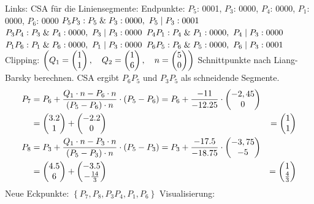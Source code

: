 \documentclass[a4paper,10pt,DIV=14]{article}
\begin{document}
\newpage
Links: \newline
CSA für die Liniensegmente: \newline
Endpunkte: $P_5$: 0001, $P_3$: 0000, $P_4$: 0000, $P_1$: 0000, $P_6$: 0000 \newline
$P_5P_3: P_5 \mathrel{\&} P_3: 0000,\ P_5 \mathrel{|} P_3: 0001$ \newline
$P_3P_4: P_3 \mathrel{\&} P_4: 0000,\ P_3 \mathrel{|} P_3: 0000$ \newline
$P_4P_1: P_4 \mathrel{\&} P_1: 0000,\ P_4 \mathrel{|} P_3: 0000$ \newline
$P_1P_6: P_1 \BitAnd P_6: 0000,\ P_1 \BitOr P_3: 0000$ \newline
$P_6P_5: P_6 \mathrel{\&} P_5: 0000,\ P_6 \mathrel{|} P_3: 0001$ \newline
Clipping: $\left(Q_1= \begin{pmatrix} 1 \\ 1 \end{pmatrix}, \quad Q_2= \begin{pmatrix} 1 \\ 6 \end{pmatrix}, \quad n = \begin{pmatrix} 5 \\ 0 \end{pmatrix} \right)$\newline
Schnittpunkte nach Liang-Barsky berechnen. CSA ergibt $P_6P_5$ und $P_3P_5$ als schneidende Segmente.\newline
\begin{align*}
P_7 &= P_6 + \frac{Q_1 \cdot n - P_6 \cdot n}{\left(P_5-P_6\right) \cdot n} \cdot \left(P_5-P_6\right) = P_6 + \frac{-11}{-12.25} \cdot \begin{pmatrix} -2,45 \\ 0 \end{pmatrix} \\ &= \begin{pmatrix} 3.2 \\ 1 \end{pmatrix} + \begin{pmatrix} -2.2 \\ 0 \end{pmatrix} &= \begin{pmatrix} 1 \\ 1 \end{pmatrix}
\\
P_8 &= P_3 + \frac{Q_1 \cdot n - P_3 \cdot n}{\left(P_5 - P_3\right) \cdot n} \cdot \left(P_5 - P_3\right) = P_3 + \frac{-17.5}{-18.75} \cdot \begin{pmatrix} -3,75 \\ -5 \end{pmatrix} \\ &= \begin{pmatrix} 4.5 \\ 6 \end{pmatrix} + \begin{pmatrix} -3.5 \\ -\frac{14}{3} \end{pmatrix} &= \begin{pmatrix} 1 \\ \frac{4}{3} \end{pmatrix}
\end{align*}
Neue Eckpunkte: $\left\lbrace P_7, P_8, P_3 P_4, P_1, P_6  \right\rbrace $\newline
Visualisierung: \newline
\begin{center}
\end{center}
\end{document}
